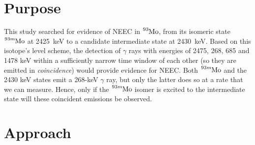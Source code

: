 \documentclass[12pt,a4paper]{article}
\begin{document}
\section*{Purpose}
This study searched for evidence of NEEC in $\ce{^{93}Mo}$, from its isomeric state $\ce{^{93m}Mo}$ at 2425~keV to a candidate intermediate state at 2430~keV. Based on this isotope's level scheme, the detection of $\gamma$ rays with energies of 2475, 268, 685 and 1478 keV within a sufficiently narrow time window of each other (so they are emitted in \textit{coincidence}) would provide evidence for NEEC. Both $\ce{^{93m}Mo}$ and the 2430 keV states emit a 268-keV $\gamma$ ray, but only the latter does so at a rate that we can measure. Hence, only if the $\ce{^{93m}Mo}$ isomer is excited to the intermediate state will these coincident emissions be observed.

\section*{Approach}
\end{document}
